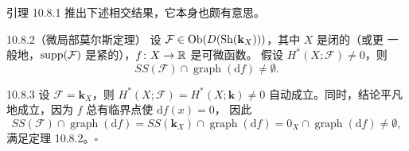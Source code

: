 引理 10.8.1 推出下述相交结果，它本身也颇有意思。

\begin{wthm}{10.8.2（微局部莫尔斯定理）}
  设 $\mathcal F\in\operatorname{Ob}(D(\operatorname{Sh}(\mathbf{k}_X)))$，其中 $X$ 是闭的（或更
  一般地，$\operatorname{supp}(\mathcal F)$ 是紧的），$f\colon X\to\mathbb{R}$ 是可微函数。
  假设 $H^*(X;\mathcal F)\ne0$，则
  \[
    SS(\mathcal F)\cap\operatorname{graph}(\mathrm df)\ne\emptyset.
  \]
\end{wthm}


\begin{wexam}{10.8.3}
  设 $\mathcal F=\mathbf{k}_X$，则 $H^*(X;\mathcal F)=H^*(X;\mathbf{k})\ne0$
  自动成立。同时，结论平凡地成立，因为 $f$ 总有临界点使 $\mathrm df(x)=0$，
  因此
  \[
    SS(\mathcal F)\cap\operatorname{graph}(\mathrm df)
    =SS(\mathbf{k}_X)\cap\operatorname{graph}(\mathrm df)
    =0_X\cap\operatorname{graph}(\mathrm df)\ne\emptyset,
  \]
  满足定理 10.8.2。\hfill$\square$
\end{wexam}

